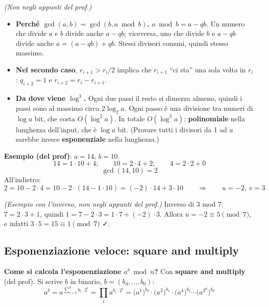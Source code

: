 \begin{nota}
\emph{(Non negli appunti del prof.)}
\begin{itemize}
  \item \textbf{Perché \(\gcd(a, b) = \gcd(b, a \bmod b)\).} \(a \bmod b = a - qb\). Un numero che divide \(a\) e \(b\) divide anche \(a - qb\); viceversa, uno che divide \(b\) e \(a - qb\) divide anche \(a = (a - qb) + qb\). Stessi divisori comuni, quindi stesso massimo.
  \item \textbf{Nel secondo caso}, \(r_{i+1} > r_i/2\) implica che \(r_{i+1}\) ``ci sta'' una sola volta in \(r_i\): \(q_{i+2} = 1\) e \(r_{i+2} = r_i - r_{i+1}\).
  \item \textbf{Da dove viene \(\log^3\).} Ogni due passi il resto si dimezza almeno, quindi i passi sono al massimo circa \(2 \log_2 a\). Ogni passo è una divisione tra numeri di \(\log a\) bit, che costa \(O(\log^2 a)\). In totale \(O(\log^3 a)\): \textbf{polinomiale} nella lunghezza dell'input, che è \(\log a\) bit. (Provare tutti i divisori da 1 ad \(a\) sarebbe invece \textbf{esponenziale} nella lunghezza.)
\end{itemize}
\end{nota}

\begin{esempio}
\textbf{Esempio (del prof)}: \(a = 14\), \(b = 10\).
\[
14 = 1 \cdot 10 + 4; \qquad 10 = 2 \cdot 4 + 2; \qquad 4 = 2 \cdot 2 + 0
\]
\[
\gcd(14, 10) = 2
\]
All'indietro:
\[
2 = 10 - 2 \cdot 4 = 10 - 2 \cdot (14 - 1 \cdot 10) = (-2) \cdot 14 + 3 \cdot 10 \qquad \Rightarrow \qquad u = -2, \ v = 3
\]

\emph{(Esempio con l'inverso, non negli appunti del prof.)} Inverso di \(3\) mod \(7\): \(7 = 2 \cdot 3 + 1\), quindi \(1 = 7 - 2 \cdot 3 = 1 \cdot 7 + (-2) \cdot 3\). Allora \(u = -2 \equiv 5 \pmod 7\), e infatti \(3 \cdot 5 = 15 \equiv 1 \pmod 7\) ✓.
\end{esempio}

\subsection{Esponenziazione veloce: square and multiply}

\textbf{Come si calcola l'esponenziazione \(a^b \bmod n\)?} Con \textbf{square and multiply} (del prof). Si scrive \(b\) in binario, \(b = (b_d, \dots, b_0)\):
\[
a^b = a^{\sum_{i=0}^{d} b_i \cdot 2^i} = \prod_i a^{b_i \cdot 2^i} = \big(a^{1}\big)^{b_0} \cdot \big(a^{2}\big)^{b_1} \cdot \big(a^{4}\big)^{b_2} \cdots \big(a^{2^d}\big)^{b_d}
\]

